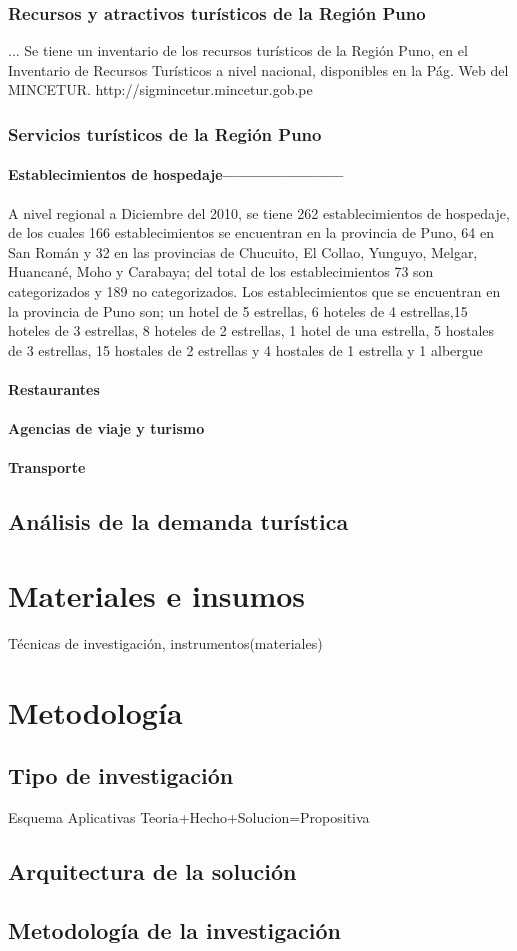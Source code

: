 \subsubsection{Recursos y atractivos turísticos de la Región Puno}
...
Se tiene un inventario de los recursos turísticos de la Región Puno, en el Inventario de Recursos Turísticos a nivel nacional, disponibles en la Pág. Web del MINCETUR. http://sigmincetur.mincetur.gob.pe
\subsubsection{Servicios turísticos de la Región Puno}
\paragraph{Establecimientos de hospedaje-----------------------}
A nivel regional a Diciembre del 2010, se tiene 262 establecimientos de hospedaje, de los cuales 166 establecimientos se encuentran en la provincia de Puno, 64 en San Román y 32 en las provincias de Chucuito, El Collao, Yunguyo, Melgar, Huancané, Moho y Carabaya; del total de los establecimientos 73 son categorizados y 189 no categorizados. Los establecimientos que se encuentran en la provincia de Puno son; un hotel de 5 estrellas, 6 hoteles de 4 estrellas,15 hoteles de 3 estrellas, 8 hoteles de 2 estrellas, 1 hotel de una estrella, 5 hostales de 3 estrellas, 15 hostales de 2 estrellas y 4 hostales de 1 estrella y 1 albergue
\paragraph{Restaurantes}
\paragraph{Agencias de viaje y turismo}
\paragraph{Transporte}
\subsection{Análisis de la demanda turística}



\section{Materiales e insumos}
Técnicas de investigación, instrumentos(materiales)

\section{Metodología}
\subsection{Tipo de investigación}
Esquema
Aplicativas
Teoria+Hecho+Solucion=Propositiva
\subsection{Arquitectura de la solución}
\subsection{Metodología de la investigación}
